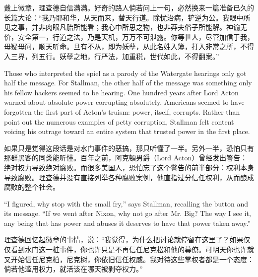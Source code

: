\ifdefined\chs
戴上徽章，理查德自信满满。好奇的路人倘若问上一句，必然换来一篇准备已久的长篇大论：“我乃耶和华，从天而来，替天行道。除忧治病，铲逆为公。我眼中所见之事，并非肉眼凡胎所能看；我心中所思之物，也非莽夫俗子所能解。神谕无价，安全第一，行道之法，乃是天机，万万不可泄露。你等世人，尽管加信于我，毋疑毋问，顺天听命。旦有不从，即为妖孽，从此名姓入簿，打入非常之所，不得入三界，列五行。妖孽之地，行严法，加重税，世代如此，不得翻案。”
\fi

\ifdefined\eng
Those who interpreted the spiel as a parody of the Watergate hearings only got half the message. For Stallman, the other half of the message was something only his fellow hackers seemed to be hearing. One hundred years after Lord Acton warned about absolute power corrupting absolutely, Americans seemed to have forgotten the first part of Acton's truism: power, itself, corrupts. Rather than point out the numerous examples of petty corruption, Stallman felt content voicing his outrage toward an entire system that trusted power in the first place.
\fi

\ifdefined\chs
如果只是觉得这段话是对水门事件的恶搞，那只听懂了一半。另外一半，恐怕只有那群黑客的同类能听懂。百年之前，阿克頓男爵（Lord Acton）曾经发出警告：绝对权力导致绝对腐败。而很多美国人，恐怕忘了这个警告的前半部分：权利本身导致腐败。理查德并没有直接列举各种腐败案例，他直指过分信任权利，从而酿成腐败的整个社会。
\fi

\ifdefined\eng
``I figured, why stop with the small fry,'' says Stallman, recalling the button and its message. ``If we went after Nixon, why not go after Mr. Big? The way I see it, any being that has power and abuses it deserves to have that power taken away.''
\fi

\ifdefined\chs
理查德回忆起徽章的事情，说：“我觉得，为什么把讨论就停留在这里了？如果仅仅看到水门这一桩事件，你也许只是不再信任尼克松和他的幕僚。可明天你也许就又开始信任尼克柏，尼克树，你依旧信任权威。我对待这些掌权者都是一个态度：倘若他滥用权力，就活该在哪天被剥夺权力。”
\fi

\theendnotes
\setcounter{endnote}{0}
